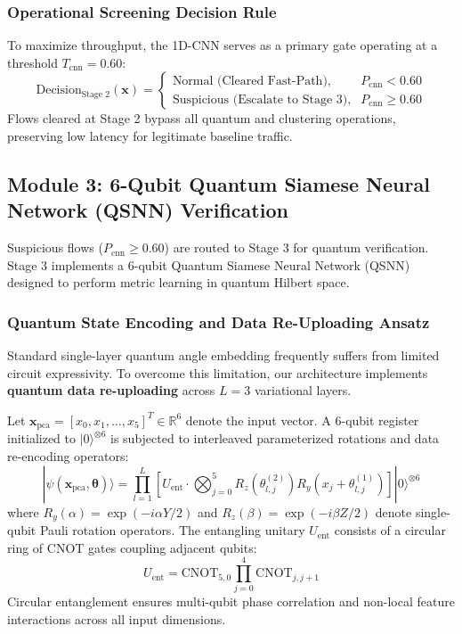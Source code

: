 \documentclass[preprint,12pt]{elsarticle}
\begin{document}
\subsubsection{Operational Screening Decision Rule}
To maximize throughput, the 1D-CNN serves as a primary gate operating at a threshold $T_{\text{cnn}} = 0.60$:
\begin{equation}
    \text{Decision}_{\text{Stage 2}}(\mathbf{x}) = \begin{cases}
        \text{Normal (Cleared Fast-Path)}, & P_{\text{cnn}} < 0.60 \\
        \text{Suspicious (Escalate to Stage 3)}, & P_{\text{cnn}} \ge 0.60
    \end{cases}
\end{equation}
Flows cleared at Stage 2 bypass all quantum and clustering operations, preserving low latency for legitimate baseline traffic.

\subsection{Module 3: 6-Qubit Quantum Siamese Neural Network (QSNN) Verification}
Suspicious flows ($P_{\text{cnn}} \ge 0.60$) are routed to Stage 3 for quantum verification. Stage 3 implements a 6-qubit Quantum Siamese Neural Network (QSNN) designed to perform metric learning in quantum Hilbert space.

\subsubsection{Quantum State Encoding and Data Re-Uploading Ansatz}
Standard single-layer quantum angle embedding frequently suffers from limited circuit expressivity. To overcome this limitation, our architecture implements \textbf{quantum data re-uploading} across $L = 3$ variational layers.

Let $\mathbf{x}_{\text{pca}} = [x_0, x_1, \dots, x_5]^T \in \mathbb{R}^6$ denote the input vector. A 6-qubit register initialized to $|0\rangle^{\otimes 6}$ is subjected to interleaved parameterized rotations and data re-encoding operators:
\begin{equation}
    |\psi(\mathbf{x}_{\text{pca}}, \boldsymbol{\theta})\rangle = \prod_{l=1}^L \left[ U_{\text{ent}} \cdot \bigotimes_{j=0}^5 R_z(\theta_{l,j}^{(2)}) R_y(x_j + \theta_{l,j}^{(1)}) \right] |0\rangle^{\otimes 6}
\end{equation}
where $R_y(\alpha) = \exp(-i \alpha Y / 2)$ and $R_z(\beta) = \exp(-i \beta Z / 2)$ denote single-qubit Pauli rotation operators. The entangling unitary $U_{\text{ent}}$ consists of a circular ring of CNOT gates coupling adjacent qubits:
\begin{equation}
    U_{\text{ent}} = \text{CNOT}_{5,0} \prod_{j=0}^4 \text{CNOT}_{j, j+1}
\end{equation}
Circular entanglement ensures multi-qubit phase correlation and non-local feature interactions across all input dimensions.
\end{document}
